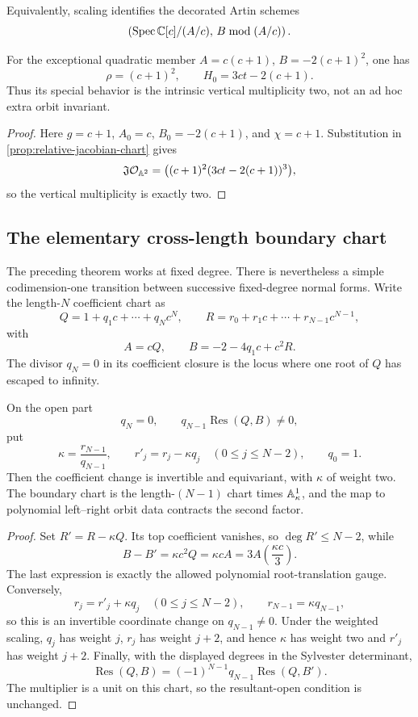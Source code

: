 Equivalently, scaling identifies the decorated Artin schemes
\[
\left(\operatorname{Spec}\mathbb C[c]/(A/c),\,B\bmod(A/c)\right).
\]
\begin{proposition}
\label{prop:q-minus-two-weighted-stratum}
For the exceptional quadratic member
\(A=c(c+1)\), \(B=-2(c+1)^2\), one has
\[
\rho=(c+1)^2,\qquad H_0=3ct-2(c+1).
\]
Thus its special behavior is the intrinsic vertical multiplicity two, not
an ad hoc extra orbit invariant.
\end{proposition}

\begin{proof}
Here \(g=c+1\), \(A_0=c\), \(B_0=-2(c+1)\), and
\(\chi=c+1\).  Substitution in
\cref{prop:relative-jacobian-chart} gives
\[
\mathfrak J\mathcal O_{\mathbb A^2}
=\bigl((c+1)^2(3ct-2(c+1))^3\bigr),
\]
so the vertical multiplicity is exactly two.
\end{proof}

\subsection{The elementary cross-length boundary chart}

The preceding theorem works at fixed degree.  There is nevertheless a
simple codimension-one transition between successive fixed-degree normal
forms.  Write the length-\(N\) coefficient chart as
\[
 Q=1+q_1c+\cdots+q_Nc^N,\qquad
 R=r_0+r_1c+\cdots+r_{N-1}c^{N-1},
\]
with
\[
 A=cQ,\qquad B=-2-4q_1c+c^2R.
\]
The divisor \(q_N=0\) in its coefficient closure is the locus where one
root of \(Q\) has escaped to infinity.

\begin{proposition}
\label{prop:one-root-transition}
On the open part
\[
 q_N=0,\qquad q_{N-1}\operatorname{Res}(Q,B)\ne0,
\]
put
\[
 \kappa=\frac{r_{N-1}}{q_{N-1}},\qquad
 r'_j=r_j-\kappa q_j\quad(0\le j\le N-2),
 \qquad q_0=1.
\]
Then the coefficient change is invertible and equivariant, with \(\kappa\)
of weight two.  The boundary chart is the length-\((N-1)\) chart times
\(\mathbb A^1_\kappa\), and the map to polynomial left--right orbit data contracts
the second factor.
\end{proposition}

\begin{proof}
Set \(R'=R-\kappa Q\).  Its top coefficient vanishes, so
\(\deg R'\le N-2\), while
\[
 B-B'=\kappa c^2Q=\kappa cA
       =3A\left(\frac{\kappa c}{3}\right).
\]
The last expression is exactly the allowed polynomial root-translation
gauge.  Conversely,
\[
 r_j=r'_j+\kappa q_j\quad(0\le j\le N-2),\qquad
 r_{N-1}=\kappa q_{N-1},
\]
so this is an invertible coordinate change on \(q_{N-1}\ne0\).  Under the
weighted scaling, \(q_j\) has weight \(j\), \(r_j\) has weight \(j+2\),
and hence \(\kappa\) has weight two and \(r'_j\) has weight \(j+2\).
Finally, with the displayed degrees in the Sylvester determinant,
\[
 \operatorname{Res}(Q,B)
 =(-1)^{N-1}q_{N-1}\operatorname{Res}(Q,B').
\]
The multiplier is a unit on this chart, so the resultant-open condition is
unchanged.
\end{proof}

